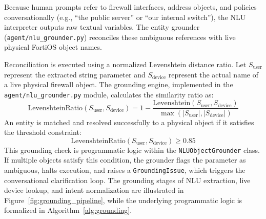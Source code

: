 Because human prompts refer to firewall interfaces, address objects, and policies conversationally (e.g., ``the public server'' or ``our internal switch''), the NLU interpreter outputs raw textual variables. The entity grounder (\texttt{agent/nlu\_grounder.py}) reconciles these ambiguous references with live physical FortiOS object names.

Reconciliation is executed using a normalized Levenshtein distance ratio. Let $S_{\text{user}}$ represent the extracted string parameter and $S_{\text{device}}$ represent the actual name of a live physical firewall object. The grounding engine, implemented in the \texttt{agent/nlu\_grounder.py} module, calculates the similarity ratio as:
\begin{equation}
    \text{LevenshteinRatio}(S_{\text{user}}, S_{\text{device}}) = 1 - \frac{\text{Levenshtein}(S_{\text{user}}, S_{\text{device}})}{\max(|S_{\text{user}}|, |S_{\text{device}}|)}
\end{equation}
An entity is matched and resolved successfully to a physical object if it satisfies the threshold constraint:
\begin{equation}
    \text{LevenshteinRatio}(S_{\text{user}}, S_{\text{device}}) \ge 0.85
\end{equation}
This grounding check is programmatic logic within the \texttt{NLUObjectGrounder} class. If multiple objects satisfy this condition, the grounder flags the parameter as ambiguous, halts execution, and raises a \texttt{GroundingIssue}, which triggers the conversational clarification loop. The grounding stages of NLU extraction, live device lookup, and intent normalization are illustrated in Figure~\ref{fig:grounding_pipeline}, while the underlying programmatic logic is formalized in Algorithm~\ref{alg:grounding}.

